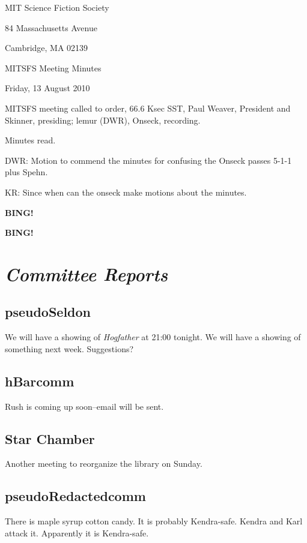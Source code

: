 \documentclass[10pt]{article}
\newcommand{\bing}{{\bf BING!} }
\newcommand{\goto}[1]{\bing \vskip 12pt \section*{{\em{#1}}}}
\newcommand{\ps}{ plus Spehn\xspace}
\newcommand{\skinner}{Paul Weaver, President and Skinner}
\newcommand{\onseck}{lemur (DWR), Onseck}
\newcommand{\meetingdate}{Friday, 13 August 2010}
\begin{document}
\begin{center}

MIT Science Fiction Society

84 Massachusetts Avenue

Cambridge, MA 02139

\vspace{12pt}

MITSFS Meeting Minutes

\meetingdate

\end{center}

\vspace{18pt}

\setlength{\parskip}{6pt}

\noindent
MITSFS meeting called to order, 66.6 Ksec SST,
\skinner, presiding; \onseck, recording.

Minutes read.

DWR: Motion to commend the minutes for confusing the Onseck passes 5-1-1\ps.

KR: Since when can the onseck make motions about the minutes.

\bing

\goto{Committee Reports}

\subsection*{pseudoSeldon}

We will have a showing of \emph{Hogfather} at 21:00 tonight.  We will have
a showing of something next week.  Suggestions?

\subsection*{hBarcomm}

Rush is coming up soon--email will be sent.

\subsection*{Star Chamber}

Another meeting to reorganize the library on Sunday.

\subsection*{pseudoRedactedcomm}

There is maple syrup cotton candy.  It is probably Kendra-safe.  Kendra
and Karl attack it.  Apparently it is Kendra-safe.
\end{document}
